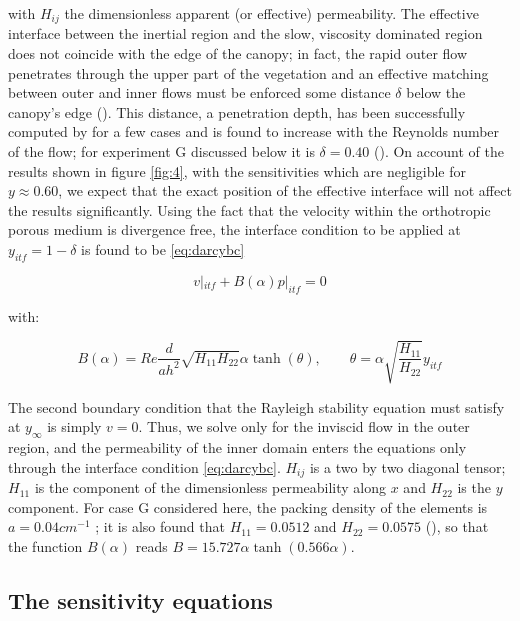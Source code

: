 with ${H}_{ij}$ the dimensionless apparent (or effective) permeability. The effective interface between the inertial region and the
slow, viscosity dominated region does not coincide with the edge of the canopy; in fact, the rapid
outer flow penetrates through the upper part of the vegetation and an effective matching between
outer and inner flows must be enforced some distance $\delta$ below the canopy’s edge (\citet{le2006interfacial}).  This distance,
a penetration depth, has been successfully computed by \citet{zampogna2016fluid} for a few cases
and is found to increase with the Reynolds number of the flow; for experiment G discussed below it
is $\delta = 0.40$ (\citet{zampognaprivate}). On account of the results shown in figure \ref{fig:4}, with the sensitivities which are negligible
for $y \approx 0.60$, we expect that the exact position of the effective interface will not affect the results
significantly.
Using the fact that the velocity within the orthotropic porous medium is divergence free, the
interface condition to be applied at $y_{itf} = 1 - \delta$ is found to be \eqref{eq:darcybc}

\begin{equation}
v|_{itf} + B(\alpha) p|_{itf} = 0
\label{eq:darcybc}
\end{equation}

with:

$$
B(\alpha) = Re \dfrac{d}{ah^2} \sqrt{{H}_{11} {H}_{22}} \alpha \tanh (\theta), \qquad \theta = \alpha \sqrt{\dfrac{{H}_{11}}{{H}_{22}}}  y_{itf}
$$

The second boundary condition that the Rayleigh stability equation must satisfy at $y_{\infty}$ is simply $v = 0$. Thus, we solve only for the inviscid flow in the outer region, and the permeability
of the inner domain enters the equations only through the interface condition \eqref{eq:darcybc}. ${H}_{ij}$ is a two by two diagonal tensor; ${H}_{11}$ is the component of the dimensionless permeability along $x$ and
${H}_{22}$ is the $y$ component. For case G considered here, the packing density of the elements is
$a = 0.04 cm^{-1}$ ; it is also found that ${H}_{11}= 0.0512$ and ${H}_{22} = 0.0575$ (\citet{zampognaprivate}), so that the function $B(\alpha)$
reads $B = 15.727 \alpha \tanh (0.566 \alpha)$.


\subsection{The sensitivity equations}


